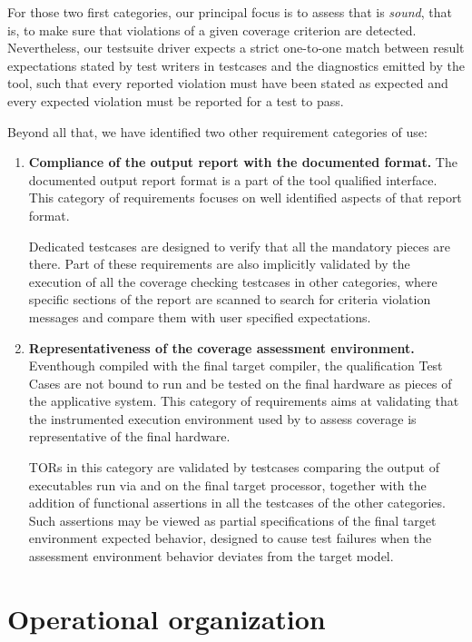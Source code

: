 \documentclass {report}
\begin{document}
For those two first categories, our principal focus is to assess that \xcov{}
is \emph{sound}, that is, to make sure that violations of a given coverage
criterion are detected.
%
Nevertheless, our testsuite driver expects a strict one-to-one match between
result expectations stated by test writers in testcases and the diagnostics
emitted by the tool, such that every reported violation must have been stated
as expected and every expected violation must be reported for a test to pass.

Beyond all that, we have identified two other requirement categories of use:

\begin{enumerate}
\item \textbf{Compliance of the output report with the documented format.}
%
The documented output report format is a part of the tool qualified interface.
% 
This category of requirements focuses on well identified aspects of that
report format.

Dedicated testcases are designed to verify that all the mandatory pieces are
there.
%
Part of these requirements are also implicitly validated by the execution of
all the coverage checking testcases in other categories, where specific
sections of the report are scanned to search for criteria violation messages
and compare them with user specified expectations.

\item \textbf{Representativeness of the coverage assessment environment.}
%
Eventhough compiled with the final target compiler, the qualification Test
Cases are not bound to run and be tested on the final hardware as pieces of
the applicative system.
%
This category of requirements aims at validating that the instrumented
execution environment used by \xcov{} to assess coverage is representative of
the final hardware.

TORs in this category are validated by testcases comparing the output of
executables run via \xcov{} and on the final target processor, together with
the addition of functional assertions in all the testcases of the other
categories.
%
Such assertions may be viewed as partial specifications of the final target
environment expected behavior, designed to cause test failures when the
assessment environment behavior deviates from the target model.
\end{enumerate}

\section{Operational organization}
\end{document}
